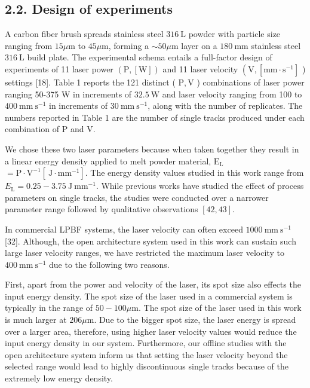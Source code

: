 \documentclass[10pt]{article}
\begin{document}
\subsection*{2.2. Design of experiments}
A carbon fiber brush spreads stainless steel $316 \mathrm{~L}$ powder with particle size ranging from $15 \mu \mathrm{m}$ to $45 \mu \mathrm{m}$, forming a $\sim 50 \mu \mathrm{m}$ layer on a $180 \mathrm{~mm}$ stainless steel $316 \mathrm{~L}$ build plate. The experimental schema entails a full-factor design of experiments of 11 laser power $(\mathrm{P},[\mathrm{W}])$ and 11 laser velocity $\left(\mathrm{V},\left[\mathrm{mm} \cdot \mathrm{s}^{-1}\right]\right.$ ) settings [18]. Table 1 reports the 121 distinct ( $\mathrm{P}, \mathrm{V}$ ) combinations of laser power ranging 50-375 W in increments of $32.5 \mathrm{~W}$ and laser velocity ranging from 100 to $400 \mathrm{~mm} \mathrm{~s}^{-1}$ in increments of $30 \mathrm{~mm} \mathrm{~s}^{-1}$, along with the number of replicates. The numbers reported in Table 1 are the number of single tracks produced under each combination of $\mathrm{P}$ and $\mathrm{V}$.

We chose these two laser parameters because when taken together they result in a linear energy density applied to melt powder material, $\mathrm{E}_{\mathrm{L}}$ $=\mathrm{P} \cdot \mathrm{V}^{-1}\left[\mathrm{~J} \cdot \mathrm{mm}^{-1}\right]$. The energy density values studied in this work range from $E_{\mathrm{L}}=0.25-3.75 \mathrm{~J} \mathrm{~mm}^{-1}$. While previous works have studied the effect of process parameters on single tracks, the studies were conducted over a narrower parameter range followed by qualitative observations $[42,43]$.

In commercial LPBF systems, the laser velocity can often exceed $1000 \mathrm{~mm} \mathrm{~s}^{-1}$ [32]. Although, the open architecture system used in this work can sustain such large laser velocity ranges, we have restricted the maximum laser velocity to $400 \mathrm{~mm} \mathrm{~s}^{-1}$ due to the following two reasons.

First, apart from the power and velocity of the laser, its spot size also effects the input energy density. The spot size of the laser used in a commercial system is typically in the range of $50-100 \mu \mathrm{m}$. The spot size of the laser used in this work is much larger at $206 \mu \mathrm{m}$. Due to the bigger spot size, the laser energy is spread over a larger area, therefore, using higher laser velocity values would reduce the input energy density in our system. Furthermore, our offline studies with the open architecture system inform us that setting the laser velocity beyond the selected range would lead to highly discontinuous single tracks because of the extremely low energy density.
\end{document}
